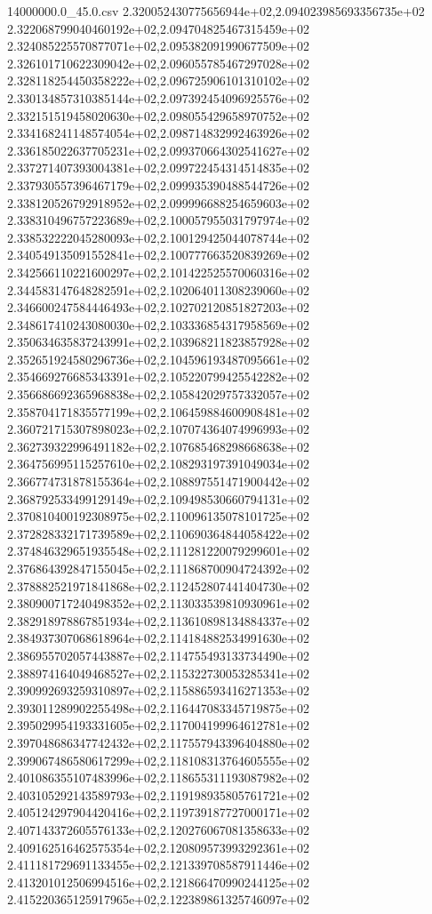 \begin{filecontents*}{14000000.0_45.0.csv}
2.320052430775656944e+02,2.094023985693356735e+02
2.322068799040460192e+02,2.094704825467315459e+02
2.324085225570877071e+02,2.095382091990677509e+02
2.326101710622309042e+02,2.096055785467297028e+02
2.328118254450358222e+02,2.096725906101310102e+02
2.330134857310385144e+02,2.097392454096925576e+02
2.332151519458020630e+02,2.098055429658970752e+02
2.334168241148574054e+02,2.098714832992463926e+02
2.336185022637705231e+02,2.099370664302541627e+02
2.337271407393004381e+02,2.099722454314514835e+02
2.337930557396467179e+02,2.099935390488544726e+02
2.338120526792918952e+02,2.099996688254659603e+02
2.338310496757223689e+02,2.100057955031797974e+02
2.338532222045280093e+02,2.100129425044078744e+02
2.340549135091552841e+02,2.100777663520839269e+02
2.342566110221600297e+02,2.101422525570060316e+02
2.344583147648282591e+02,2.102064011308239060e+02
2.346600247584446493e+02,2.102702120851827203e+02
2.348617410243080030e+02,2.103336854317958569e+02
2.350634635837243991e+02,2.103968211823857928e+02
2.352651924580296736e+02,2.104596193487095661e+02
2.354669276685343391e+02,2.105220799425542282e+02
2.356686692365968838e+02,2.105842029757332057e+02
2.358704171835577199e+02,2.106459884600908481e+02
2.360721715307898023e+02,2.107074364074996993e+02
2.362739322996491182e+02,2.107685468298668638e+02
2.364756995115257610e+02,2.108293197391049034e+02
2.366774731878155364e+02,2.108897551471900442e+02
2.368792533499129149e+02,2.109498530660794131e+02
2.370810400192308975e+02,2.110096135078101725e+02
2.372828332171739589e+02,2.110690364844058422e+02
2.374846329651935548e+02,2.111281220079299601e+02
2.376864392847155045e+02,2.111868700904724392e+02
2.378882521971841868e+02,2.112452807441404730e+02
2.380900717240498352e+02,2.113033539810930961e+02
2.382918978867851934e+02,2.113610898134884337e+02
2.384937307068618964e+02,2.114184882534991630e+02
2.386955702057443887e+02,2.114755493133734490e+02
2.388974164049468527e+02,2.115322730053285341e+02
2.390992693259310897e+02,2.115886593416271353e+02
2.393011289902255498e+02,2.116447083345719875e+02
2.395029954193331605e+02,2.117004199964612781e+02
2.397048686347742432e+02,2.117557943396404880e+02
2.399067486580617299e+02,2.118108313764605555e+02
2.401086355107483996e+02,2.118655311193087982e+02
2.403105292143589793e+02,2.119198935805761721e+02
2.405124297904420416e+02,2.119739187727000171e+02
2.407143372605576133e+02,2.120276067081358633e+02
2.409162516462575354e+02,2.120809573993292361e+02
2.411181729691133455e+02,2.121339708587911446e+02
2.413201012506994516e+02,2.121866470990244125e+02
2.415220365125917965e+02,2.122389861325746097e+02

\end{filecontents*}
